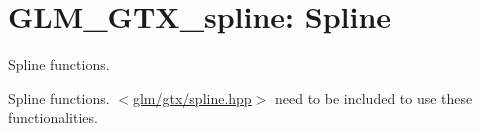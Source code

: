 \hypertarget{group__gtx__spline}{\section{\-G\-L\-M\-\_\-\-G\-T\-X\-\_\-spline\-: \-Spline}
\label{group__gtx__spline}
}


\-Spline functions.  


\-Spline functions. $<$\hyperlink{spline_8hpp}{glm/gtx/spline.\-hpp}$>$ need to be included to use these functionalities. 